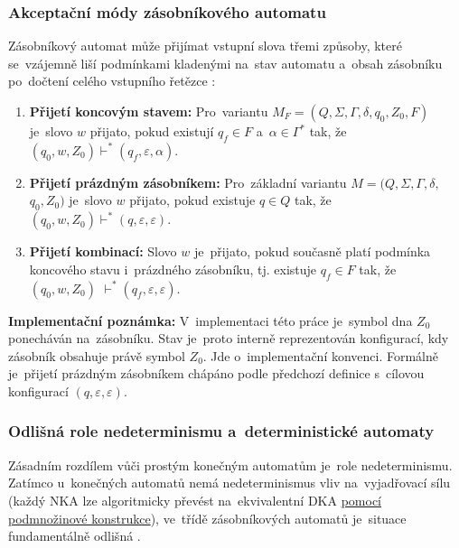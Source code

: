 \documentclass[
  master,
  program=ainfvs,
  printversion,
  figures=false,
  tables=false,
  glossaries,
  index
]{kidiplom}
\begin{document}
\subsubsection{Akceptační módy zásobníkového automatu} \label{par:prijimani}
Zásobníkový automat může přijímat vstupní slova třemi způsoby, které se~vzájemně
liší podmínkami kladenými na~stav automatu a~obsah zásobníku po~dočtení celého
vstupního řetězce \cite[kapitola~4]{jancar_ti}:

\begin{enumerate}
    \item \textbf{Přijetí koncovým stavem:} Pro~variantu
    $M_F = (Q, \Sigma, \Gamma, \delta, q_0, Z_0, F)$ je~slovo $w$ přijato,
    pokud existují $q_f \in F$ a~$\alpha \in \Gamma^*$ tak, že
    $(q_0, w, Z_0) \vdash^* (q_f, \varepsilon, \alpha)$.

    \item \textbf{Přijetí prázdným zásobníkem:} Pro~základní variantu
    $M = (Q, \Sigma, \Gamma, \delta,$ $q_0, Z_0)$ je~slovo $w$ přijato,
    pokud existuje $q \in Q$ tak, že
    $(q_0, w, Z_0) \vdash^* (q, \varepsilon, \varepsilon)$.

    \item \textbf{Přijetí kombinací:} Slovo $w$ je~přijato, pokud současně
    platí podmínka koncového stavu i~prázdného zásobníku, tj. existuje
    $q_f \in F$ tak, že
    $(q_0, w, Z_0)$ $\vdash^* (q_f, \varepsilon, \varepsilon)$.
\end{enumerate}

\textbf{Implementační poznámka:}
V~implementaci této práce je~symbol dna $Z_0$ ponecháván na~zásobníku.
Stav  je~proto interně reprezentován konfigurací, kdy zásobník
obsahuje právě symbol $Z_0$. Jde o~implementační konvenci. Formálně je~přijetí
prázdným zásobníkem chápáno podle předchozí definice s~cílovou konfigurací
$(q, \varepsilon, \varepsilon)$.

\subsubsection{Odlišná role nedeterminismu a~deterministické automaty}
Zásadním rozdílem vůči prostým konečným automatům je~role nedeterminismu. Zatímco
u~konečných automatů nemá nedeterminismus vliv na~vyjadřovací sílu (každý \gls{NKA}
lze algoritmicky převést na~ekvivalentní \gls{DKA} \hyperref[par:determinizace]{pomocí podmnožinové konstrukce}),
ve~třídě zásobníkových automatů je~situace fundamentálně odlišná
\cite[kapitola~5.2]{jancar_ti}.
\end{document}
